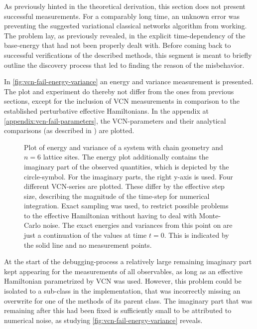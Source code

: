 As previously hinted in the theoretical derivation, this section does not present successful measurements.
For a comparably long time, an unknown error was preventing the suggested variational classical networks algorithm from working.
The problem lay, as previously revealed, in the explicit time-dependency of the base-energy that had not been properly dealt with.
Before coming back to successful verifications of the described methods, this segment is meant to briefly outline the discovery process that led to finding the reason of the misbehavior.

In \autoref{fig:vcn-fail-energy-variance} an energy and variance measurement is presented. 
The plot and experiment do thereby not differ from the ones from previous sections, except for the inclusion of VCN measurements in comparison to the established perturbative effective Hamiltonians.
In the appendix at \ref{appendix:vcn-fail-parameters}, the VCN-parameters and their analytical comparisons (as described in ) are plotted.

\begin{figure}[htbp]
    \centering
    \vspace{-0.5cm}
    \caption{
            Plot of energy and variance of a system with chain geometry and $n=6$ lattice sites.
            The energy plot additionally contains the imaginary part of the observed quantities, which is depicted by the circle-symbol.
            For the imaginary parts, the right y-axis is used.
            Four different VCN-series are plotted. These differ by the effective step size, describing the magnitude of the time-step for numerical integration.
            Exact sampling was used, to restrict possible problems to the effective Hamiltonian without having to deal with Monte-Carlo noise.
            The exact energies and variances from this point on are just a continuation of the values at time $t=0$. This is indicated by the solid line and no measurement points.
        }
    \label{fig:vcn-fail-energy-variance}
\end{figure}

At the start of the debugging-process a relatively large remaining imaginary part kept appearing for the measurements of all observables, as long as an effective Hamiltonian parametrized by VCN was used.
However, this problem could be isolated to a sub-class in the implementation, that was incorrectly missing an overwrite for one of the methods of its parent class.
The imaginary part that was remaining after this had been fixed is sufficiently small to be attributed to numerical noise, as studying \autoref{fig:vcn-fail-energy-variance} reveals.

